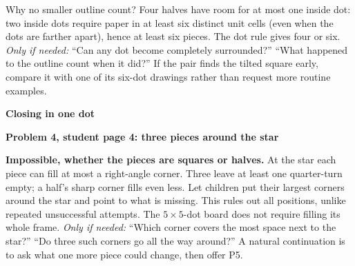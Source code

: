 \documentclass[11pt]{article}
\newcommand{\head}[1]{\par\textbf{\large #1}\par}
\newcommand{\sub}[1]{\par\textbf{#1}\par}
\newcommand{\hint}[1]{\textit{Only if needed:} #1}
\begin{document}
Why no smaller outline count? Four halves have room for at most one inside dot: two inside dots require paper in at least six distinct unit cells (even when the dots are farther apart), hence at least six pieces. The dot rule gives four or six. \hint{``Can any dot become completely surrounded?'' ``What happened to the outline count when it did?''} If the pair finds the tilted square early, compare it with one of its six-dot drawings rather than request more routine examples.

\newpage
\head{Closing in one dot}
\sub{Problem 4, student page 4: three pieces around the star}
\textbf{Impossible, whether the pieces are squares or halves.} At the star each piece can fill at most a right-angle corner. Three leave at least one quarter-turn empty; a half's sharp corner fills even less. Let children put their largest corners around the star and point to what is missing. This rules out all positions, unlike repeated unsuccessful attempts. The $5\times5$-dot board does not require filling its whole frame. \hint{``Which corner covers the most space next to the star?'' ``Do three such corners go all the way around?''} A natural continuation is to ask what one more piece could change, then offer P5.
\end{document}
